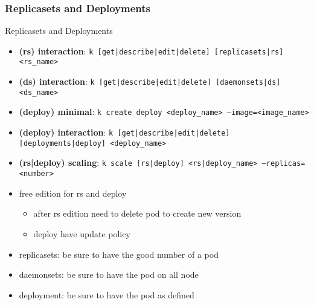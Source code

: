 \subsubsection{Replicasets and Deployments}
\begin{frame}{Replicasets and Deployments}

  \begin{itemize}
    \item \textbf{(rs) interaction}: \texttt{k [get|describe|edit|delete] [replicasets|rs] <rs\_name>}
    \item \textbf{(ds) interaction}: \texttt{k [get|describe|edit|delete] [daemonsets|ds] <ds\_name>}
    \item \textbf{(deploy) minimal}: \texttt{k create deploy <deploy\_name> --image=<image\_name>}
    \item \textbf{(deploy) interaction}: \texttt{k [get|describe|edit|delete] [deployments|deploy] <deploy\_name>}
    \item \textbf{(rs|deploy) scaling}: \texttt{k scale [rs|deploy] <rs|deploy\_name> --replicas=<number>}
    \item free edition for rs and deploy
    \begin{itemize}
      \item after rs edition need to delete pod to create new version
      \item deploy have update policy
    \end{itemize}
    \item replicasets: be sure to have the good number of a pod
    \item daemonsets: be sure to have the pod on all node
    \item deployment: be sure to have the pod as defined
  \end{itemize}
  
\end{frame}
